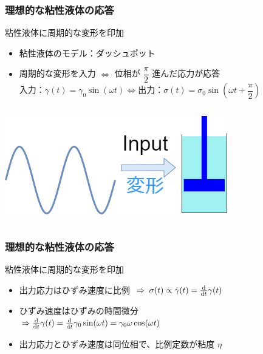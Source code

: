 \documentclass[12pt, dvipdfmx]{beamer}
\begin{document}
\begin{frame}
    \frametitle{理想的な粘性液体の応答}
		\begin{block}{粘性液体に周期的な変形を印加}
			\begin{itemize}
				\item 粘性液体のモデル：ダッシュポット
				\item 周期的な変形を入力 $\Leftrightarrow$ 位相が $\dfrac{\pi}{2}$ 進んだ応力が応答\\
				$\text{入力：}\gamma (t) = \gamma_0 \sin(\omega t) \Leftrightarrow \text{出力：}\sigma(t) = \sigma_0 \sin(\omega t + \dfrac{\pi}{2})$
			\end{itemize}
		\end{block}
		\begin{columns}[c, onlytextwidth]
				\centering
					\includegraphics[width=\textwidth]{dynamic_Visco.png}
				
				\centering
		\end{columns}
\end{frame}

\begin{frame}
    \frametitle{理想的な粘性液体の応答}
		\begin{block}{粘性液体に周期的な変形を印加}
			\begin{itemize}
				\item 出力応力はひずみ速度に比例 $\; \Rightarrow \; \sigma (t) \propto \dot{\gamma}(t) = \odv*{\gamma (t)}{t} $
				\item ひずみ速度はひずみの時間微分 \\
				$\Rightarrow \odv*{\gamma(t)}{t} = \odv*{\gamma_0 \sin(\omega t)}{t} = \gamma_0 \omega \cos(\omega t)$
				\item 出力応力とひずみ速度は同位相で、比例定数が粘度 $\eta$
			\end{itemize}
		\end{block}

		\centering
\end{frame}
\end{document}
